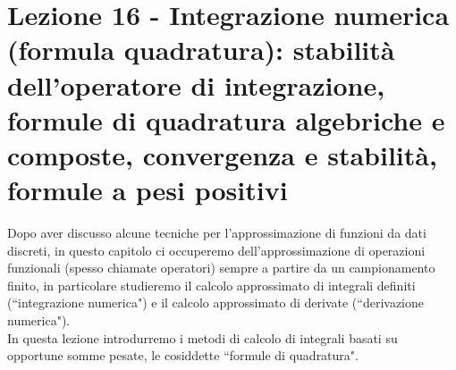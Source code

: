 \documentclass[12pt,a4paper]{article}
\begin{document}
\section[Lezione 16 - Integrazione numerica, formule di quadratura]{Lezione 16 - Integrazione numerica (formula quadratura): stabilità dell'operatore di integrazione, formule di quadratura algebriche e composte, convergenza e stabilità, formule a pesi positivi}
Dopo aver discusso alcune tecniche per l'approssimazione di funzioni da dati discreti, in questo capitolo ci occuperemo dell'approssimazione di operazioni funzionali (spesso chiamate operatori) sempre a partire da un campionamento finito, in particolare studieremo il calcolo approssimato di integrali definiti (``integrazione numerica") e il calcolo approssimato di derivate (``derivazione numerica").\\
In questa lezione introdurremo i metodi di calcolo di integrali basati su opportune somme pesate, le cosiddette ``formule di quadratura".
\end{document}
